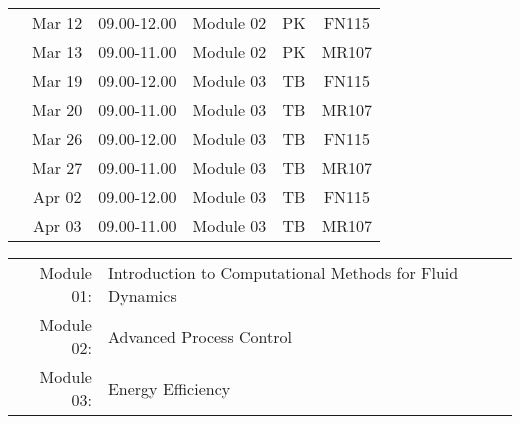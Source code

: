 \documentclass[12pt,oneside,a4paper]{article}
\begin{document}
\begin{center}
\begin{tabular}{||c||c|c|c|c|c||}
\hline
\multirow{3}{*}{\color{red}{Week 35}} & Mar 12   & 09.00-12.00 & Module 02 & PK  & FN115 \\
                                      & Mar 13   & 09.00-11.00 & Module 02 & PK  & MR107 \\
\hline
\multirow{3}{*}{\color{red}{Week 36}} & Mar 19   & 09.00-12.00 & Module 03 & TB  & FN115 \\
                                      & Mar 20   & 09.00-11.00 & Module 03 & TB  & MR107 \\
\hline
\multirow{3}{*}{\color{red}{Week 37}} & Mar 26   & 09.00-12.00 & Module 03 & TB  & FN115 \\
                                      & Mar 27   & 09.00-11.00 & Module 03 & TB  & MR107 \\
\hline
\multirow{3}{*}{\color{red}{Week 38}} & Apr 02   & 09.00-12.00 & Module 03 & TB  & FN115 \\
                                      & Apr 03   & 09.00-11.00 & Module 03 & TB  & MR107 \\
\hline\hline

\end{tabular}
\end{center}

\bigskip

\begin{center}
\begin{tabular}{r l}
Module 01: & Introduction to Computational Methods for Fluid Dynamics \\
Module 02: & Advanced Process Control \\
Module 03: & Energy Efficiency \\ 
\end{tabular}
\end{center}

\vfill
\end{document}
